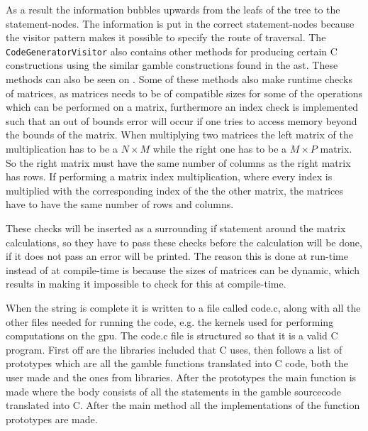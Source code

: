As a result the information bubbles upwards from the leafs of the tree to the statement-nodes.
The information is put in the correct statement-nodes because the visitor pattern makes it possible to specify the route of traversal.
The \texttt{CodeGeneratorVisitor} also contains other methods for producing certain C constructions using the similar \gls{gamble} constructions found in the \acrshort{ast}.
These methods can also be seen on .
Some of these methods also make runtime checks of matrices, as matrices needs to be of compatible sizes for some of the operations which can be performed on a matrix, furthermore an index check is implemented such that an out of bounds error will occur if one tries to access memory beyond the bounds of the matrix.
When multiplying two matrices the left matrix of the multiplication has to be a $ N \times M $ while the right one has to be a $ M \times P $ matrix.
So the right matrix must have the same number of columns as the right matrix has rows.
If performing a matrix index multiplication, where every index is multiplied with the corresponding index of the the other matrix, the matrices have to have the same number of rows and columns.

These checks will be inserted as a surrounding if statement around the matrix calculations, so they have to pass these checks before the calculation will be done, if it does not pass an error will be printed.
The reason this is done at run-time instead of at compile-time is because the sizes of matrices can be dynamic, which results in making it impossible to check for this at compile-time.

When the string is complete it is written to a file called code.c, along with all the other files needed for running the code, e.g. the kernels used for performing computations on the \acrshort{gpu}.
The code.c file is structured so that it is a valid C program.
First off are the libraries included that C uses, then follows a list of prototypes which are all the \gls{gamble} functions translated into C code, both the user made and the ones from libraries.
After the prototypes the main function is made where the body consists of all the statements in the \gls{gamble} sourcecode translated into C.
After the main method all the implementations of the function prototypes are made.